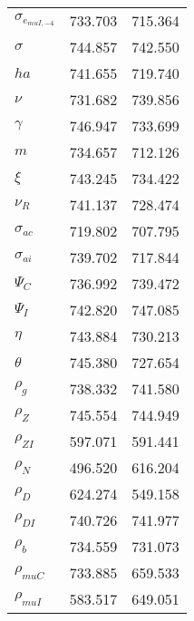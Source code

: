 \begin{center}
\begin{longtable}{lcc}
$ \sigma_{{e_{muI,-4}}}   $	 & 	     733.703	 & 	     715.364 \\ 
$ {\sigma}                $	 & 	     744.857	 & 	     742.550 \\ 
$ {ha}                    $	 & 	     741.655	 & 	     719.740 \\ 
$ \nu                     $	 & 	     731.682	 & 	     739.856 \\ 
$ \gamma                  $	 & 	     746.947	 & 	     733.699 \\ 
$ {m}                     $	 & 	     734.657	 & 	     712.126 \\ 
$ \xi                     $	 & 	     743.245	 & 	     734.422 \\ 
$ {\nu_R}                 $	 & 	     741.137	 & 	     728.474 \\ 
$ {\sigma_{ac}}           $	 & 	     719.802	 & 	     707.795 \\ 
$ {\sigma_{ai}}           $	 & 	     739.702	 & 	     717.844 \\ 
$ {\Psi_C}                $	 & 	     736.992	 & 	     739.472 \\ 
$ {\Psi_I}                $	 & 	     742.820	 & 	     747.085 \\ 
$ {\eta}                  $	 & 	     743.884	 & 	     730.213 \\ 
$ {\theta}                $	 & 	     745.380	 & 	     727.654 \\ 
$ {\rho_g}                $	 & 	     738.332	 & 	     741.580 \\ 
$ {\rho_Z}                $	 & 	     745.554	 & 	     744.949 \\ 
$ {\rho_{ZI}}             $	 & 	     597.071	 & 	     591.441 \\ 
$ {\rho_N}                $	 & 	     496.520	 & 	     616.204 \\ 
$ {\rho_D}                $	 & 	     624.274	 & 	     549.158 \\ 
$ {\rho_{DI}}             $	 & 	     740.726	 & 	     741.977 \\ 
$ {\rho_b}                $	 & 	     734.559	 & 	     731.073 \\ 
$ {\rho_{muC}}            $	 & 	     733.885	 & 	     659.533 \\ 
$ {\rho_{muI}}            $	 & 	     583.517	 & 	     649.051 \\ 
\end{longtable}
 \end{center}

